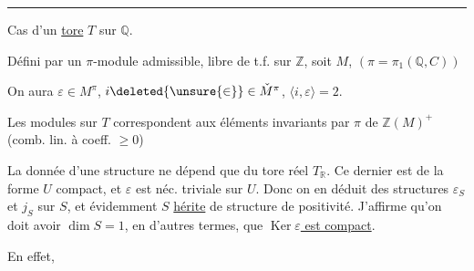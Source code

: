 
\begin{center}\rule{3cm}{0.4pt}\end{center}

Cas d'un \uline{tore} $T$ sur $\mathbb Q$.

Défini par un $\pi$-module admissible, libre de t.f. sur $\mathbb Z$, soit $M$, $(\pi=\pi_1(\mathbb Q,C))$

On aura $\varepsilon\in M^\pi$, $i\deleted{\unsure{\in}}\in\check M^\pi$, $\langle i,\varepsilon\rangle=2$.

Les modules sur $T$ correspondent aux éléments invariants par $\pi$ de $\mathbb Z(M)^+$ (comb. lin. à coeff. $\geq 0$)


La donnée d'une structure   ne dépend que du tore réel $T_{\mathbb R}$. Ce dernier est de la forme   $U$ compact,   et $\varepsilon$ est néc. triviale sur $U$. Donc on en déduit des structures $\varepsilon_S$ et $j_S$ sur $S$, et évidemment $S$ \uline{hérite} de structure de positivité. J'affirme qu'on doit avoir $\dim S=1$, en d'autres termes, que \uline{$\operatorname{Ker}\varepsilon$ est compact}.

En effet, 
